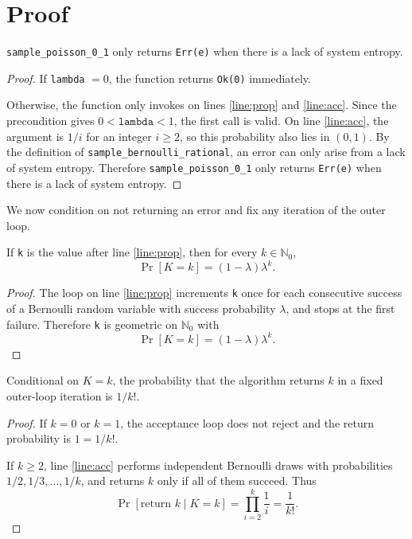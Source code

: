 \documentclass{article}
\begin{document}
\section{Proof}

\begin{lemma}
\label{err-e}
\texttt{sample\_poisson\_0\_1} only returns \texttt{Err(e)} when there is a lack of system entropy.
\end{lemma}

\begin{proof}
If \texttt{lambda} $= 0$, the function returns \texttt{Ok(0)} immediately.

Otherwise, the function only invokes
on lines \ref{line:prop} and \ref{line:acc}. Since the precondition gives
$0 < \texttt{lambda} < 1$, the first call is valid. On line \ref{line:acc},
the argument is $1/i$ for an integer $i \ge 2$, so this probability also lies in $(0,1)$.
By the definition of \texttt{sample\_bernoulli\_rational}, an error can only arise from
a lack of system entropy. Therefore \texttt{sample\_poisson\_0\_1} only returns
\texttt{Err(e)} when there is a lack of system entropy.
\end{proof}

We now condition on not returning an error and fix any iteration of the outer loop.

\begin{lemma}
\label{proposal}
If \texttt{k} is the value after line \ref{line:prop}, then for every $k \in \mathbb{N}_0$,
\[
\Pr[K = k] = (1-\lambda)\lambda^k.
\]
\end{lemma}

\begin{proof}
The loop on line \ref{line:prop} increments \texttt{k} once for each consecutive success
of a Bernoulli random variable with success probability $\lambda$, and stops at the first failure.
Therefore \texttt{k} is geometric on $\mathbb{N}_0$ with
\[
\Pr[K = k] = (1-\lambda)\lambda^k.
\]
\end{proof}

\begin{lemma}
\label{accept}
Conditional on $K=k$, the probability that the algorithm returns $k$ in a fixed outer-loop
iteration is $1/k!$.
\end{lemma}

\begin{proof}
If $k=0$ or $k=1$, the acceptance loop does not reject and the return probability is $1 = 1/k!$.

If $k \ge 2$, line \ref{line:acc} performs independent Bernoulli draws with probabilities
$1/2, 1/3, \ldots, 1/k$, and returns $k$ only if all of them succeed. Thus
\[
\Pr[\text{return } k \mid K=k]
=
\prod_{i=2}^k \frac{1}{i}
=
\frac{1}{k!}.
\]
\end{proof}
\end{document}
